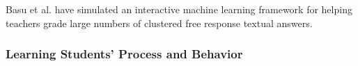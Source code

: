 Basu et al. \cite{basupowergrading} have simulated an interactive machine learning framework for helping teachers grade large numbers of clustered free response textual answers.




\subsubsection{Learning Students' Process and Behavior}




%
%





%
%
%


